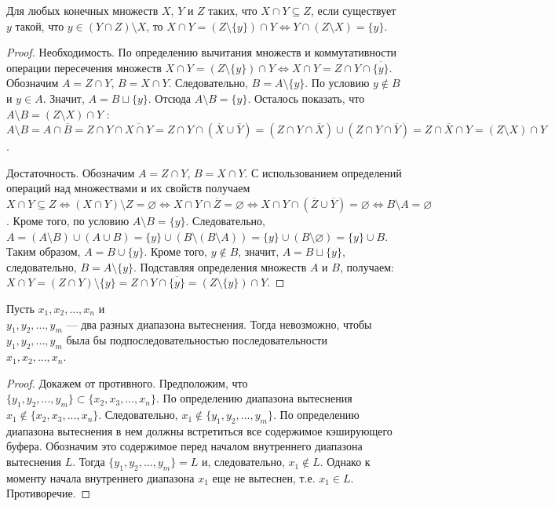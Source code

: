 \begin{lemma}
Для любых конечных множеств $X$, $Y$ и $Z$ таких, что $X \cap Y
\subseteq Z$, если существует $y$ такой, что $y \in (Y \cap
Z)\setminus X$, то $X \cap Y = (Z \setminus \{y\}) \cap Y
\Leftrightarrow Y \cap ( Z \setminus X ) = \{ y \}$.
\end{lemma}
\begin{proof}
Необходимость. По определению вычитания множеств и коммутативности
операции пересечения множеств $X \cap Y = (Z \setminus \{y\}) \cap Y
\Leftrightarrow X \cap Y = Z \cap Y \cap \overline{\{y\}}$.
Обозначим $A = Z \cap Y$, $B = X \cap Y$. Следовательно, $B = A
\setminus \{y\}$. По условию $y \notin B$ и $y \in A$. Значит, $A =
B \sqcup \{y\}$. Отсюда $A \setminus B = \{y\}$. Осталось показать,
что $A \setminus B = (Z \setminus X ) \cap Y$ : $A \setminus B = A
\cap \overline{B} = Z \cap Y \cap \overline{X \cap Y} = Z \cap Y
\cap (\overline{X} \cup \overline{Y}) = (Z \cap Y \cap \overline{X})
\cup (Z \cap Y \cap \overline{Y}) = Z \cap \overline{X} \cap Y = (Z
\setminus X ) \cap Y$.

Достаточность. Обозначим $A = Z \cap Y$, $B = X \cap Y$. С
использованием определений операций над множествами и их свойств
получаем $X \cap Y \subseteq Z \Leftrightarrow (X \cap Y) \setminus
Z = \varnothing \Leftrightarrow X \cap Y \cap \overline{Z} =
\varnothing \Leftrightarrow X \cap Y \cap (\overline{Z} \cup
\overline{Y}) = \varnothing \Leftrightarrow B \setminus A =
\varnothing$. Кроме того, по условию $A \setminus B = \{y\}$.
Следовательно, $A = (A \setminus B) \cup (A \cup B) = \{y\} \cup (B
\setminus (B \setminus A)) = \{y\} \cup (B \setminus \varnothing) =
\{y\} \cup B$. Таким образом, $A = B \cup \{y\}$. Кроме того, $y
\notin B$, значит, $A = B \sqcup \{y\}$, следовательно, $B = A
\setminus \{y\}$. Подставляя определения множеств $A$ и $B$,
получаем: $X \cap Y = (Z \cap Y) \setminus \{y\} = Z \cap Y \cap
\overline{\{y\}} = (Z \setminus \{y\}) \cap Y$.
\end{proof}

\begin{lemma}\label{includedranges}
  Пусть $x_1, x_2, ..., x_n$ и\\ $y_1, y_2, ..., y_m$ --- два разных
  диапазона вытеснения. Тогда невозможно, чтобы $y_1, y_2,
  ..., y_m$ была бы подпоследовательностью последовательности\\ $x_1,
  x_2, ..., x_n$.
\end{lemma}
\begin{proof}
  Докажем от противного. Предположим, что\\ $\{y_1, y_2, ..., y_m\}
  \subset \{x_2, x_3, ..., x_n\}$. По определению диапазона
  вытеснения $x_1 \notin \{x_2, x_3, ..., x_n\}$. Следовательно,
  $x_1 \notin \{y_1, y_2, ..., y_m\}$. По определению диапазона
  вытеснения в нем должны встретиться все содержимое кэширующего
  буфера. Обозначим это содержимое перед началом внутреннего
  диапазона вытеснения $L$. Тогда $\{y_1, y_2, ..., y_m\} = L$ и,
  следовательно, $x_1 \notin L$. Однако к моменту начала внутреннего
  диапазона $x_1$ еще не вытеснен, т.е. $x_1 \in L$. Противоречие.
\end{proof}

